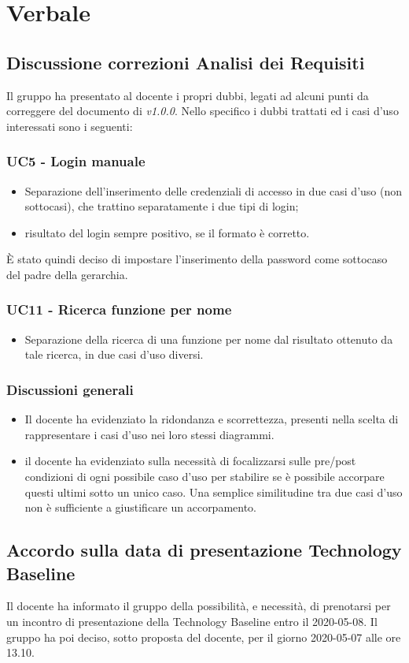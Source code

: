 \section{Verbale}
\subsection{Discussione correzioni Analisi dei Requisiti}
Il gruppo ha presentato al docente i propri dubbi, legati ad alcuni punti da correggere del documento di \AdR{} \textit{v1.0.0}.
Nello specifico i dubbi trattati ed i casi d'uso interessati sono i seguenti:
\subsubsection*{UC5 - Login manuale}
\begin{itemize}
	\item Separazione dell'inserimento delle credenziali di accesso in due casi d'uso (non sottocasi), che trattino separatamente i due tipi di login;
	\item risultato del login sempre positivo, se il formato è corretto.
\end{itemize}
È stato quindi deciso di impostare l'inserimento della password come sottocaso del padre della gerarchia.
\subsubsection*{UC11 - Ricerca funzione per nome}
\begin{itemize}
	\item Separazione della ricerca di una funzione per nome dal risultato ottenuto da tale ricerca, in due casi d'uso diversi.
\end{itemize}
\subsubsection*{Discussioni generali}
\begin{itemize}
	\item Il docente ha evidenziato la ridondanza e scorrettezza, presenti nella scelta di rappresentare i casi d'uso nei loro stessi diagrammi.
	\item il docente ha evidenziato sulla necessità di focalizzarsi sulle pre/post condizioni di ogni possibile caso d'uso per stabilire se è possibile accorpare questi ultimi sotto un unico caso. Una semplice similitudine tra due casi d'uso non è sufficiente a giustificare un accorpamento.
\end{itemize}

\subsection{Accordo sulla data di presentazione Technology Baseline}
Il docente ha informato il gruppo della possibilità, e necessità, di prenotarsi per un incontro di presentazione della Technology Baseline entro il 2020-05-08. Il gruppo ha poi deciso, sotto proposta del docente, per il giorno 2020-05-07 alle ore 13.10.

